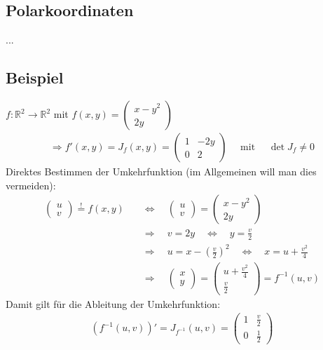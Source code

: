 \documentclass[11pt,a4paper]{book}
\newcommand {\R}	{\mathbb{R}}
\newcommand{\1}    	{\mathbbm{1}}
\newcommand{\mitt}	{\textrm{ mit }}
\newcommand{\fum}	{f^{-1}}
\begin{document}
\subsection{Polarkoordinaten}
...

\subsection{Beispiel}
\(f: \R^2 \rightarrow \R^2\) mit \(f(x,y) = \left( \begin{array}{c}
	x - y^2 \\ 2y
\end{array} \right) \)
\begin{align*}
	\Rightarrow f'(x,y) = J_f(x,y) = \left( \begin{array}{cc}
		1 &  -2y \\
		0 & 2
	\end{array} \right) \quad\mitt\quad \det J_f \neq 0
\end{align*}
Direktes Bestimmen der Umkehrfunktion (im Allgemeinen will man dies vermeiden):
\begin{align*}
	\left( \begin{array}{c}
		u \\ v
	\end{array} \right) \stackrel{!}{=} f(x,y)
	\quad&\Leftrightarrow\quad \left( \begin{array}{c}
		u \\ v
	\end{array} \right) = \left( \begin{array}{c}
		x - y^2 \\ 2y
	\end{array} \right)	\\
	&\Rightarrow\quad v = 2y \quad\Leftrightarrow\quad y = \frac{v}{2} \\
	&\Rightarrow\quad u = x - \left( \frac{v}{2} \right)^2 
	\quad\Leftrightarrow\quad x = u + \frac{v^2}{4} \\
	&\Rightarrow\quad
	\left( \begin{array}{c}
		x \\ y
	\end{array} \right) = \left( \begin{array}{c}
		u + \frac{v^2}{4} \\ \frac{v}{2}
	\end{array} \right) = 	
	\fum(u,v)
\end{align*}
Damit gilt für die Ableitung der Umkehrfunktion:
\begin{align*}
	\left( \fum(u,v) \right)' = J_{\fum} (u,v) = \left( \begin{array}{cc}
		1 & \frac{v}{2} \\
		0 & \frac{1}{2}
	\end{array} \right)
\end{align*}
\end{document}
